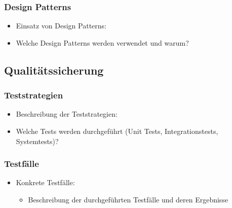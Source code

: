 \subsubsection{Design Patterns}\label{design-patterns}

\begin{itemize}
  \item
        Einsatz von Design Patterns:
  \item
        Welche Design Patterns werden verwendet und warum?
\end{itemize}

\subsection{Qualitätssicherung}\label{qualituxe4tssicherung}

\subsubsection{Teststrategien}\label{teststrategien}

\begin{itemize}
  \item
        Beschreibung der Teststrategien:
  \item
        Welche Tests werden durchgeführt (Unit Tests, Integrationstests, Systemtests)?
\end{itemize}

\subsubsection{Testfälle}\label{testfuxe4lle}

\begin{itemize}
  \item
        Konkrete Testfälle:

        \begin{itemize}

          \item
                Beschreibung der durchgeführten Testfälle und deren Ergebnisse
        \end{itemize}
\end{itemize}